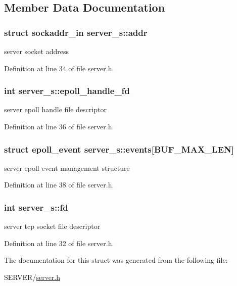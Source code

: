 \subsection{Member Data Documentation}
\hypertarget{structserver__s_a09fe17ff633d4d26a4080d46749c1fe3}{
\subsubsection[{addr}]{\setlength{\rightskip}{0pt plus 5cm}struct sockaddr\-\_\-in server\-\_\-s\-::addr}}\label{structserver__s_a09fe17ff633d4d26a4080d46749c1fe3}


server socket address 



Definition at line 34 of file server.\-h.

\hypertarget{structserver__s_a86019c8230bc00f711bb8276a07442f0}{
\subsubsection[{epoll\-\_\-handle\-\_\-fd}]{\setlength{\rightskip}{0pt plus 5cm}int server\-\_\-s\-::epoll\-\_\-handle\-\_\-fd}}\label{structserver__s_a86019c8230bc00f711bb8276a07442f0}


server epoll handle file descriptor 



Definition at line 36 of file server.\-h.

\hypertarget{structserver__s_a9095f17d03e5eb5c4e99092cbec45eed}{
\subsubsection[{events}]{\setlength{\rightskip}{0pt plus 5cm}struct epoll\-\_\-event server\-\_\-s\-::events\mbox{[}{\bf B\-U\-F\-\_\-\-M\-A\-X\-\_\-\-L\-E\-N}\mbox{]}}}\label{structserver__s_a9095f17d03e5eb5c4e99092cbec45eed}


server epoll event management structure 



Definition at line 38 of file server.\-h.

\hypertarget{structserver__s_a6129acbc6b313f77efeb488754f559ec}{
\subsubsection[{fd}]{\setlength{\rightskip}{0pt plus 5cm}int server\-\_\-s\-::fd}}\label{structserver__s_a6129acbc6b313f77efeb488754f559ec}


server tcp socket file descriptor 



Definition at line 32 of file server.\-h.



The documentation for this struct was generated from the following file\-:\begin{DoxyCompactItemize}
\item 
S\-E\-R\-V\-E\-R/\hyperlink{server_8h}{server.\-h}\end{DoxyCompactItemize}
